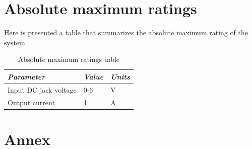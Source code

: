 \documentclass[a4paper,12pt]{article}
\begin{document}
\section{Absolute maximum ratings}

Here is presented a table that summarizes the absolute maximum rating of the system.

\begin{table}[htbp] \centering
    \begin{tabular}{l|l|l}
        \emph{Parameter} & \emph{Value} & \emph{Units}\\ \hline
        Input DC jack voltage & 0-6 & V\\
        Output current & 1 & A
    \end{tabular}
\caption{Absolute maximum ratings table}\label{tab:exp}
\end{table}
\newpage

\section{Annex}



\end{document}
